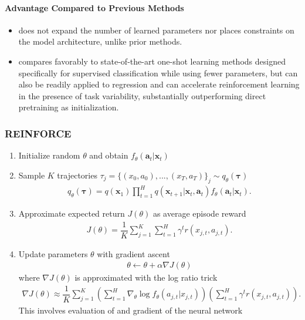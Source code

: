 \documentclass{article}
\begin{document}
	\paragraph{Advantage Compared to Previous Methods}
	\begin{itemize}
		\item  does not expand the number of learned parameters nor places constraints on the model architecture, unlike prior methods.
		\item compares favorably to state-of-the-art one-shot learning methods designed specifically for supervised classification while using fewer parameters, but can also be readily applied to regression and can accelerate reinforcement learning in the presence of task variability, substantially outperforming direct pretraining as initialization.
	\end{itemize}

	\subsubsection{REINFORCE}
	\begin{enumerate}
		\item Initialize random $\theta$ and obtain $f_{\theta}(\boldsymbol{a}_t | \boldsymbol{x}_t)$
		\item Sample $K$ trajectories $\tau_j = \{(x_0, a_0), ..., (x_T,a_T)\}_j \sim q_{\theta}(\boldsymbol{\tau})$
		\begin{align}
			q_{\theta}(\boldsymbol{\tau}) = q(\boldsymbol{x}_1)\prod_{t=1}^{H} q(\boldsymbol{x}_{t+1} \vert \boldsymbol{x}_t, \boldsymbol{a}_t) f_{\theta}(\boldsymbol{a}_t \vert \boldsymbol{x}_t).
		\end{align}
		\item Approximate expected return $J(\theta)$ as average episode reward
		\begin{align}
			J(\theta) = \dfrac{1}{K} \sum_{j=1}^{K} \sum_{t=1}^{H} \gamma^t r(x_{j,t}, a_{j,t}).
		\end{align}
		\item Update parameters $\theta$ with gradient ascent
		\begin{align}
			\theta \leftarrow \theta + \alpha \nabla J(\theta)
		\end{align}
		where $\nabla J(\theta)$ is approximated with the log ratio trick
		\begin{align}
			\nabla J(\theta) \approx \dfrac{1}{K} \sum_{j=1}^{K} \left( \sum_{t=1}^{H} \nabla_{\theta} \log f_{\theta}(a_{j,t} \vert x_{j,t}) \right) \left(\sum_{t=1}^{H} \gamma^t r(x_{j,t}, a_{j,t})\right).
		\end{align}
		This involves evaluation of and gradient of the neural network
	\end{enumerate} 
\end{document}
